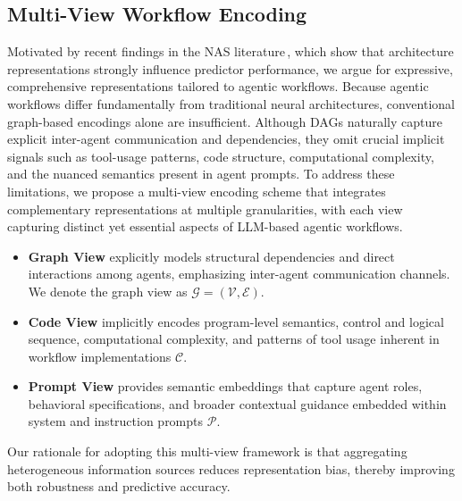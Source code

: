 \subsection{Multi-View Workflow Encoding} \label{section:multiview_encoding}
Motivated by recent findings in the NAS literature\,\citep{EncodingNAS_NeurIPS_20, FLAN_ICML_24, PASTA_TETCI_24}, which show that architecture representations strongly influence predictor performance, we argue for expressive, comprehensive representations tailored to agentic workflows. Because agentic workflows differ fundamentally from traditional neural architectures, conventional graph-based encodings alone are insufficient. Although DAGs naturally capture explicit inter-agent communication and dependencies, they omit crucial implicit signals such as tool-usage patterns, code structure, computational complexity, and the nuanced semantics present in agent prompts. To address these limitations, we propose a multi-view encoding scheme that integrates complementary representations at multiple granularities, with each view capturing distinct yet essential aspects of LLM-based agentic workflows.
\begin{itemize}[leftmargin=10pt, nosep, noitemsep]
    \item \textbf{Graph View} explicitly models structural dependencies and direct interactions among agents, emphasizing inter-agent communication channels. We denote the graph view as $\mathcal{G} = (\mathcal{V}, \mathcal{E})$.
    \item \textbf{Code View} implicitly encodes program-level semantics, control and logical sequence, computational complexity, and patterns of tool usage inherent in workflow implementations $\mathcal{C}$.
    \item \textbf{Prompt View} provides semantic embeddings that capture agent roles, behavioral specifications, and broader contextual guidance embedded within system and instruction prompts $\mathcal{P}$.
\end{itemize}
Our rationale for adopting this multi-view framework is that aggregating heterogeneous information sources reduces representation bias, thereby improving both robustness and predictive accuracy.


